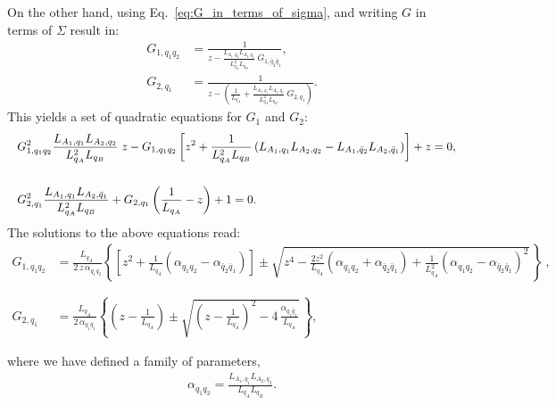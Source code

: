 \documentclass[aps,pra,reprint,superscriptaddress,twocolumn,notitlepage]{revtex4-1}
\numberwithin{equation}{section}
\begin{document}
\begin{widetext}
On the other hand, using Eq.~\eqref{eq:G_in_terms_of_sigma}, and writing $G$ in terms of $\Sigma$ result in:
\begin{equation}
\begin{aligned}
    G_{1,q_1q_2} &= \frac{1}{z - \frac{L_{A_1,\bar{q}_2} L_{A_2,\bar{q}_1}}{L_{q_A}^2 L_{q_B}} \ G_{1,\bar{q}_2\bar{q}_1} },\\
    G_{2,q_1} &= \frac{1}{z - \left( \frac{1}{L_{q_A}} +\frac{L_{A_1,q_1}L_{A_2,\bar{q}_1}}{L_{q_A}^2 L_{q_B}} \ G_{2,q_1}  \right)}.
\end{aligned}    
\end{equation}
This yields a set of quadratic equations for $G_1$ and $G_2$:
\begin{equation}
\begin{aligned}
   & G_{1,q_1q_2}^2 \frac{L_{A_1,q_1} L_{A_2,q_2}}{L_{q_A}^2 L_{q_B}} \; z   - G_{1,q_1q_2} \left[z^2 + \frac{1}{L_{q_A}^2L_{q_B} } \left(  L_{A_1,q_1} L_{A_2,q_2} - L_{A_1,\bar{q}_2} L_{A_2,\bar{q}_1} \right) \right]  + z = 0, \\
   \phantom{\tiny -}\\
    & G_{2,q_1}^2 \frac{L_{A_1,q_1} L_{A_2,\bar{q}_1}}{L_{q_A}^2 L_{q_B}} + G_{2,q_1} \left( \frac1{L_{q_A}} - z \right)  + 1 =0.
\end{aligned}    
\end{equation}
The solutions to the above equations read:
\begin{equation}\label{eq:Gs_general_aolution_semicircle_regime}
\begin{aligned}
     G_{1,q_1q_2} &= \frac{L_{q_A} \ }{2 \, z \, \alpha_{q_1q_2} } \left\{ \left[ z^2 + \frac{1}{L_{q_A}} \left( \alpha_{q_1q_2} - \alpha_{\bar{q}_2 \bar{q}_1} \right) \right]   \pm \sqrt{z^4 -  \frac{2z^2}{L_{q_A}} \left( \alpha_{q_1q_2} + \alpha_{\bar{q}_2 \bar{q}_1} \right)  + \frac{1}{L_{q_A}^2} \left(  \alpha_{q_1q_2} - \alpha_{\bar{q}_2 \bar{q}_1} \right)^2} \,  \right\} \ ,  \\
     \phantom{-}\\
       G_{2,q_1}  &=  \frac{L_{q_A}   }{2 \, \alpha_{q_1 \bar{q}_1} } \left\{  \left( z - \frac1{L_{q_A}} \right) \pm \sqrt{ \left( z - \frac1{L_{q_A}}  \right)^2 - 4 \, \frac{\alpha_{q_1 \bar{q}_1} }{L_{q_A}}  } \,  \right\},
\end{aligned}
\end{equation}
%
\end{widetext}

where we have defined a family of parameters,
\begin{align}
    \alpha_{q_1q_2} = \frac{L_{A_1,q_1} L_{A_2,q_2}}{L_{q_A} L_{q_B}}.
\end{align} 
\end{document}
